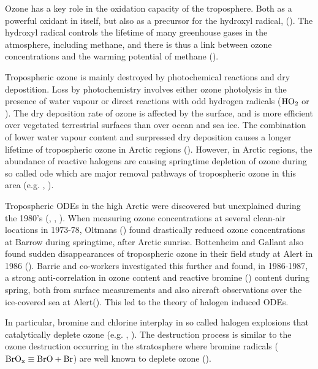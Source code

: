 \medskip

Ozone has a key role in the oxidation capacity of the troposphere. Both as a powerful oxidant in itself, but also as a precursor for the hydroxyl radical,  (\cite{WangJacob1998}). The hydroxyl radical controls the lifetime of many greenhouse gases in the atmosphere, including methane, and there is thus a link between ozone concentrations and the warming potential of methane (\cite{Levy1971}). 

\medskip

Tropospheric ozone is mainly destroyed by photochemical reactions and dry depostition. Loss by photochemistry involves either ozone photolysis in the presence of water vapour or direct reactions with odd hydrogen radicals ($\mathrm{HO_2}$ or ). The dry deposition rate of ozone is affected by the surface, and is more efficient over vegetated terrestrial surfaces than over ocean and sea ice. The combination of lower water vapour content and surpressed dry deposition causes a longer lifetime of tropospheric ozone in Arctic regions (\cite{AMAP2015}). However, in Arctic regions, the abundance of reactive halogens are causing springtime depletion of ozone during so called \acrfull{ode}  which are major removal pathways of tropospheric ozone in this area (e.g. \cite{Simpson2015}, \cite{AMAP2015}).

\medskip

Tropospheric ODEs in the high Arctic were discovered but unexplained during the 1980's (\cite{Oltmans1981}, \cite{oltmans1986surface}, \cite{bottenheim1986measurements}). When measuring ozone concentrations at several clean-air locations in 1973-78, Oltmans (\cite{Oltmans1981}) found drastically reduced ozone concentrations at Barrow during springtime, after Arctic sunrise. Bottenheim and Gallant also found sudden disappearances of tropospheric ozone in their field study at Alert in 1986 (\cite{bottenheim1986measurements}). Barrie and co-workers investigated this further and found, in 1986-1987, a strong anti-correlation in ozone content and reactive bromine () content during spring, both from surface measurements and also aircraft observations over the ice-covered sea at Alert(\cite{barrie}). This led to the theory of halogen induced ODEs. 

\medskip

In particular, bromine and chlorine interplay in so called halogen explosions that catalytically deplete ozone (e.g. \cite{CAO}, \cite{Simpson2015}). The destruction process is similar to the ozone destruction occurring in the stratosphere where bromine radicals ($\mathrm{BrO_x} \equiv \mathrm{BrO} + \mathrm{Br}$) are well known to deplete ozone (\cite{Parella}).   

